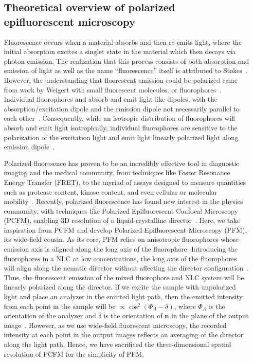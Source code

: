 \subsection{Theoretical overview of polarized epifluorescent microscopy}
Fluorescence occurs when a material absorbs and then re-emits light, where the initial absorption excites a singlet state in the material which then decays via photon emission.
The realization that this process consists of both absorption and emission of light as well as the name ``fluorescence'' itself is attributed to Stokes~\cite{RN286,RN287}.
However, the understanding that fluorescent emission could be polarized came from work by Weigert with small fluorescent molecules, or fluorophores~\cite{RN285}.
Individual fluorophores and absorb and emit light like dipoles, with the absorption/excitation dipole and the emission dipole not necessarily parallel to each other~\cite{RN282}.
Consequently, while an isotropic distribution of fluorophores will absorb and emit light isotropically, individual fluorophores are sensitive to the polarization of the excitation light and emit light linearly polarized light along emission dipole~\cite{RN282}.

Polarized fluoresence has proven to be an incredibly effective tool in diagnostic imaging and the medical community, from techniques like Foster Resonance Energy Transfer (FRET), to the myriad of assays designed to measure quantities such as protease content, kinase content, and even cellular or molecular mobility~\cite{RN282,RN284}.
Recently, polarized fluorescence has found new interest in the physics community, with techniques like Polarized Epifluorescent Confocal Microscopy (PCFM), enabling 3D resolution of a liquid-crystalline director~\cite{RN148,RN174}.
Here, we take inspiration from PCFM and develop Polarized Epifluorescent Microscopy (PFM), its wide-field cousin.
As its core, PFM relies on anisotropic fluorophores whose emission axis is aligned along the long axis of the fluorophore.
Introducing the fluorophores in a NLC at low concentrations, the long axis of the fluorophores will align along the nematic director without affecting the director configuration~\cite{RN148,RN174}.
Thus, the fluorescent emission of the mixed fluorophore and NLC system will be linearly polarized along the director.
If we excite the sample with unpolarized light and place an analyzer in the emitted light path, then the emitted intensity from each point in the sample will be $\propto \cos^2{(\Phi_A-\delta)}$, where $\Phi_A$ is the orientation of the analyzer and $\delta$ is the orientation of $\mathbf{n}$ in the plane of the output image~\cite{RN174}.
However, as we use wide-field fluorescent microscopy, the recorded intensity at each point in the output images reflects an averaging of the director along the light path.
Hence, we have sacrificed the three-dimensional spatial resolution of PCFM for the simplicity of PFM.


